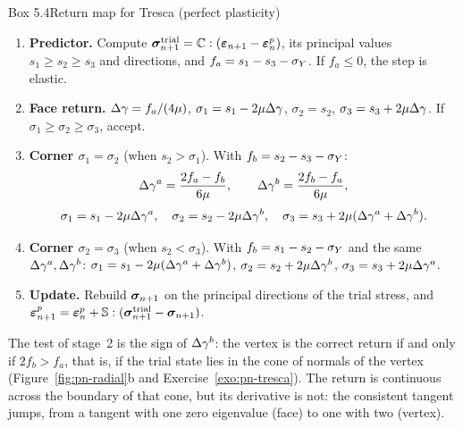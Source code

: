 \begin{gbox}{Box 5.4\quad Return map for Tresca (perfect plasticity)}
%
\begin{enumerate}[label=\textbf{\arabic*.},leftmargin=1.6em]
  \item \textbf{Predictor.} Compute $\bm{\sigma}^{\mathrm{trial}}_{n+1}=\mathbb{C}:(\bm{\varepsilon}_{n+1}-\bm{\varepsilon}^{p}_n)$, its
  principal values $s_1\ge s_2\ge s_3$ and directions, and $f_a=s_1-s_3-\sigma_{Y}$.
  If $f_a\le0$, the step is elastic.
  \item \textbf{Face return.} $\Delta\gamma=f_a/(4\mu)$,
  $\sigma_1=s_1-2\mu\Delta\gamma$, $\sigma_2=s_2$, $\sigma_3=s_3+2\mu\Delta\gamma$. If
  $\sigma_1\ge\sigma_2\ge\sigma_3$, accept.
  \item \textbf{Corner $\sigma_1=\sigma_2$} (when $s_2>\sigma_1$). With
  $f_b=s_2-s_3-\sigma_{Y}$:
  \[
    \Delta\gamma^a=\frac{2f_a-f_b}{6\mu},\qquad \Delta\gamma^b=\frac{2f_b-f_a}{6\mu},
  \]
  \[
    \sigma_1=s_1-2\mu\Delta\gamma^a,\quad\sigma_2=s_2-2\mu\Delta\gamma^b,\quad\sigma_3=s_3+2\mu(\Delta\gamma^a+\Delta\gamma^b).
  \]
  \item \textbf{Corner $\sigma_2=\sigma_3$} (when $s_2<\sigma_3$). With
  $f_b=s_1-s_2-\sigma_{Y}$ and the same $\Delta\gamma^a,\Delta\gamma^b$:
  $\sigma_1=s_1-2\mu(\Delta\gamma^a+\Delta\gamma^b)$, $\sigma_2=s_2+2\mu\Delta\gamma^b$, $\sigma_3=s_3+2\mu\Delta\gamma^a$.
  \item \textbf{Update.} Rebuild $\bm{\sigma}_{n+1}$ on the principal directions of the
  trial stress, and $\bm{\varepsilon}^{p}_{n+1}=\bm{\varepsilon}^{p}_n+\mathbb{S}:(\bm{\sigma}^{\mathrm{trial}}_{n+1}-\bm{\sigma}_{n+1})$.
\end{enumerate}
\end{gbox}
\noindent The test of stage~2 is the sign of $\Delta\gamma^b$: the vertex is the
correct return if and only if $2f_b>f_a$, that is, if the trial state lies in
the cone of normals of the vertex (Figure~\ref{fig:pn-radial}b and
Exercise~\ref{exo:pn-tresca}). The return is continuous across the boundary of
that cone, but its derivative is not: the consistent tangent jumps, from a
tangent with one zero eigenvalue (face) to one with two (vertex).


